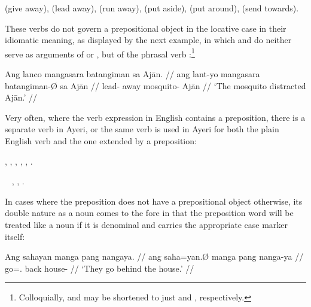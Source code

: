 \pex\label{ex:particleverbs}
\a {} (give away),
\a {} (lead away),
\a {} (run away),
\a {} (put
	aside),
\a {} (put around),
\a {} (send towards).
\xe

These verbs do not govern a prepositional object in the locative case in their
idiomatic meaning, as displayed by the next example, in which
 and  do neither serve as
arguments of  or , but of the phrasal
verb :\footnote{Colloquially,
 and  may be shortened to just
 and , respectively.}

\ex\begingl
	\gla Ang lanco mangasara batangiman sa Ajān. //
	\glb ang lant-yo mangasara batangiman-Ø sa Ajān //
	\glc \AgtT{} lead-\TsgN{} away mosquito-\Top{} \Parg{} Ajān //
	\glft `The mosquito distracted Ajān.' //
\endgl\xe

Very often, where the verb expression in English contains a preposition, there 
is a separate verb in Ayeri, or the same verb is used in Ayeri for both the 
plain English verb and the one extended by a preposition:

\pex
	\a {},
	\a {},
	\a {},
	\a {},
	\a {},
	\a {}.
\xe

\pex~
	\a {},
	\a {},
	\a {}.
\xe

In cases where the preposition does not have a prepositional object otherwise,
its double nature as a noun comes to the fore in that the preposition word will
be treated like a noun if it is denominal and carries the appropriate case
marker itself:

\pex
\a\begingl
	\gla Ang sahayan manga pang nangaya. //
	\glb ang saha=yan.Ø manga pang nanga-ya //
	\glc \AgtT{} go=\Tpl{}.\Top{} \Dir{} back house-\Loc{} //
	\glft `They go behind the house.' //
\endgl

